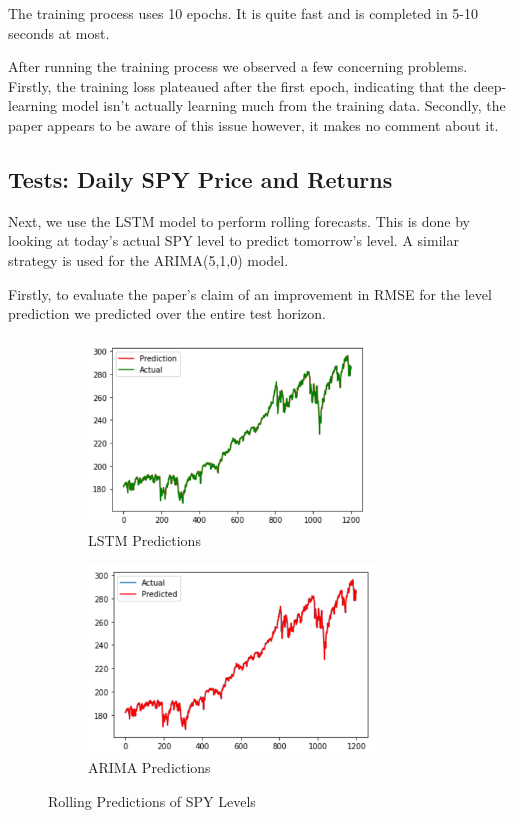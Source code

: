 \documentclass{article}
\begin{document}
The training process uses 10 epochs. It is quite fast and is completed in 5-10 seconds at most. 

After running the training process we observed a few concerning problems. Firstly, the training loss plateaued after the first epoch, indicating that the deep-learning model isn't actually learning much from the training data. Secondly, the paper appears to be aware of this issue however, it makes no comment about it. 

\subsection{Tests: Daily SPY Price and Returns}

Next, we use the LSTM model to perform rolling forecasts. This is done by looking at today's actual SPY level to predict tomorrow's level. A similar strategy is used for the ARIMA(5,1,0) model.

Firstly, to evaluate the paper's claim of an improvement in RMSE for the level prediction we predicted over the entire test horizon.

\begin{figure}[h]

\begin{subfigure}{0.5\textwidth}
\includegraphics[width=0.9\linewidth, height=5cm]{LSTM Prediction.PNG} 
\caption{LSTM Predictions}
\label{fig:subim1}
\end{subfigure}
\begin{subfigure}{0.5\textwidth}
\includegraphics[width=0.9\linewidth, height=5cm]{ARIMA Prediction.PNG}
\caption{ARIMA Predictions}
\label{fig:subim2}
\end{subfigure}

\caption{Rolling Predictions of SPY Levels}
\label{fig:image2}
\end{figure}
\end{document}
